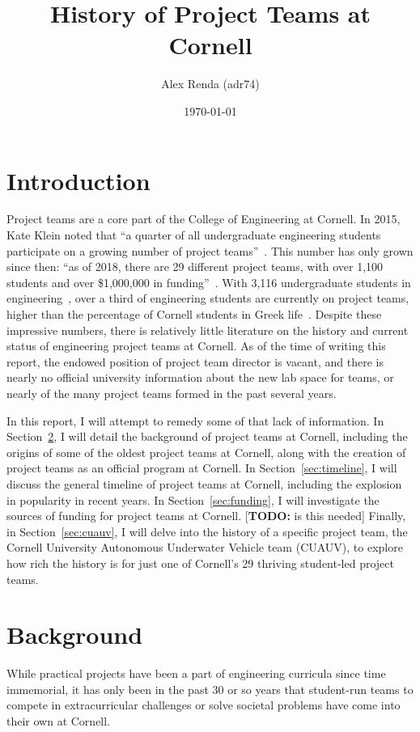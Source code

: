 \documentclass[12pt]{article}
\title{History of Project Teams at Cornell}
\author{Alex Renda (adr74)}
\date{\monthyeardate\today}
\newcommand{\todo}[1]{{\color{red}[\textbf{TODO:} #1]}}
\begin{document}
\maketitle

\section{Introduction}

Project teams are a core part of the College of Engineering at Cornell.
In 2015, Kate Klein noted that ``a quarter of all undergraduate engineering students participate on a growing number of project teams''~\cite{klein_engineering_2015}.
This number has only grown since then:
``as of 2018, there are 29 different project teams, with over 1,100 students and over \$1,000,000 in funding''~\cite{noauthor_project_2018}.
With 3,116 undergraduate students in engineering~\cite{westervelt_key_2017}, over a third of engineering students are currently on project teams, higher than the percentage of Cornell students in Greek life~\cite{noauthor_sorority_2017}.
Despite these impressive numbers, there is relatively little literature on the history and current status of engineering project teams at Cornell.
As of the time of writing this report, the endowed position of project team director is vacant, and there is nearly no official university information about the new lab space for teams, or nearly of the many project teams formed in the past several years.

In this report, I will attempt to remedy some of that lack of information.
In Section~\ref{sec:background}, I will detail the background of project teams at Cornell, including the origins of some of the oldest project teams at Cornell, along with the creation of project teams as an official program at Cornell.
In Section~\ref{sec:timeline}, I will discuss the general timeline of project teams at Cornell, including the explosion in popularity in recent years.
In Section~\ref{sec:funding}, I will investigate the sources of funding for project teams at Cornell. \todo{is this needed}
Finally, in Section~\ref{sec:cuauv}, I will delve into the history of a specific project team, the Cornell University Autonomous Underwater Vehicle team (CUAUV), to explore how rich the history is for just one of Cornell's 29 thriving student-led project teams.

\section{Background}
\label{sec:background}
While practical projects have been a part of engineering curricula since time immemorial, it has only been in the past 30 or so years that student-run teams to compete in extracurricular challenges or solve societal problems have come into their own at Cornell.
\end{document}
